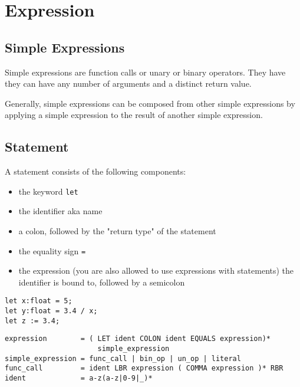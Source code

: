 \documentclass{scrartcl}
\begin{document}
\section{Expression}

\subsection{Simple Expressions}

Simple expressions are function calls or unary or binary operators. They have they can have any number of arguments and a distinct return value.

\medskip

Generally, simple expressions can be composed from other simple expressions by applying a simple expression to the result of another simple expression.

\subsection{Statement}

A statement consists of the following components:

\begin{itemize}
    \item the keyword \texttt{let}
    \item the identifier aka name
    \item a colon, followed by the "return type" of the statement
    \item the equality sign \texttt{=}
    \item the expression (you are also allowed to use expressions with statements) the identifier is bound to, followed by a semicolon
\end{itemize}

\begin{lstlisting}
let x:float = 5;
let y:float = 3.4 / x;
let z := 3.4;
\end{lstlisting}

\begin{lstlisting}
expression        = ( LET ident COLON ident EQUALS expression)*
                      simple_expression
simple_expression = func_call | bin_op | un_op | literal
func_call         = ident LBR expression ( COMMA expression )* RBR
ident             = a-z(a-z|0-9|_)*
\end{lstlisting}
\end{document}
